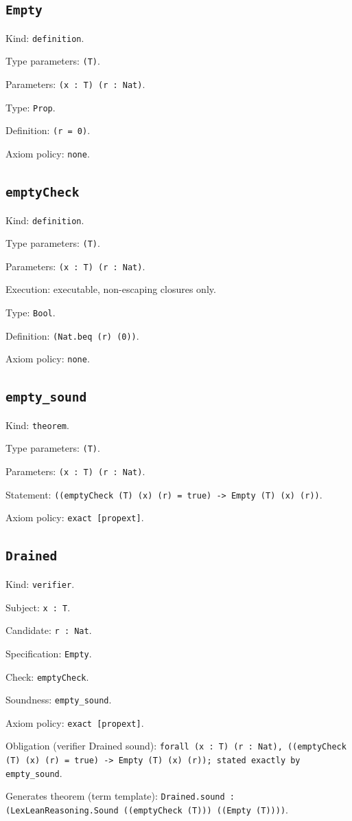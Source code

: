 \documentclass[11pt]{article}
\begin{document}
\subsection*{\texttt{Empty}}
\noindent Kind: \texttt{definition}.\par
\noindent Type parameters: \texttt{(T)}.\par
\noindent Parameters: \texttt{(x : T) (r : Nat)}.\par
\noindent Type: \texttt{Prop}.\par
\noindent Definition: \texttt{(r = 0)}.\par
\noindent Axiom policy: \texttt{none}.\par
\subsection*{\texttt{emptyCheck}}
\noindent Kind: \texttt{definition}.\par
\noindent Type parameters: \texttt{(T)}.\par
\noindent Parameters: \texttt{(x : T) (r : Nat)}.\par
\noindent Execution: executable, non-escaping closures only.\par
\noindent Type: \texttt{Bool}.\par
\noindent Definition: \texttt{(Nat.beq (r) (0))}.\par
\noindent Axiom policy: \texttt{none}.\par
\subsection*{\texttt{empty\_sound}}
\noindent Kind: \texttt{theorem}.\par
\noindent Type parameters: \texttt{(T)}.\par
\noindent Parameters: \texttt{(x : T) (r : Nat)}.\par
\noindent Statement: \texttt{((emptyCheck (T) (x) (r) = true) -> Empty (T) (x) (r))}.\par
\noindent Axiom policy: \texttt{exact [propext]}.\par
\subsection*{\texttt{Drained}}
\noindent Kind: \texttt{verifier}.\par
\noindent Subject: \texttt{x : T}.\par
\noindent Candidate: \texttt{r : Nat}.\par
\noindent Specification: \texttt{Empty}.\par
\noindent Check: \texttt{emptyCheck}.\par
\noindent Soundness: \texttt{empty\_sound}.\par
\noindent Axiom policy: \texttt{exact [propext]}.\par
\noindent Obligation (verifier Drained sound): \texttt{forall (x : T) (r : Nat), ((emptyCheck (T) (x) (r) = true) -> Empty (T) (x) (r)); stated exactly by empty\_sound}.\par
\noindent Generates theorem (term template): \texttt{Drained.sound : (LexLeanReasoning.Sound ((emptyCheck (T))) ((Empty (T))))}.\par
\end{document}
